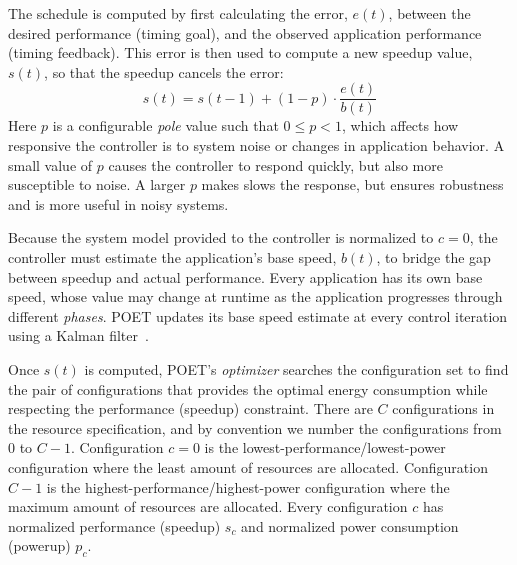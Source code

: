 The schedule is computed by first calculating the error, $e(t)$, between the desired performance (timing goal), and the observed application performance (timing feedback).
This error is then used to compute a new speedup value, $s(t)$, so that the speedup cancels the error:
\begin{equation}
  s(t) = s(t-1) + (1-p) \cdot \frac{e(t)}{b(t)} 
  \label{eqn:poet-control}
\end{equation}
Here $p$ is a configurable \emph{pole} value such that $0 \le p < 1$, which affects how responsive the controller is to system noise or changes in application behavior.
A small value of $p$ causes the controller to respond quickly, but also more susceptible to noise.
A larger $p$ makes slows the response, but ensures robustness and is more useful in noisy systems.

Because the system model provided to the controller is normalized to $c=0$, the controller must estimate the application's base speed, $b(t)$, to bridge the gap between speedup and actual performance.
Every application has its own base speed, whose value may change at runtime as the application progresses through different \emph{phases}.
POET updates its base speed estimate at every control iteration using a Kalman filter~\cite{welch2006kalman}.

Once $s(t)$ is computed, POET's \emph{optimizer} searches the configuration set to find the pair of configurations that provides the optimal energy consumption while respecting the performance (speedup) constraint.
There are $C$ configurations in the resource specification, and by convention we number the configurations from $0$ to $C-1$.
Configuration $c = 0$ is the lowest-performance/lowest-power configuration where the least amount of resources are allocated.
Configuration $C-1$ is the highest-performance/highest-power configuration where the maximum amount of resources are allocated.
Every configuration $c$ has normalized performance (speedup) $s_c$ and normalized power consumption (powerup) $p_c$.

